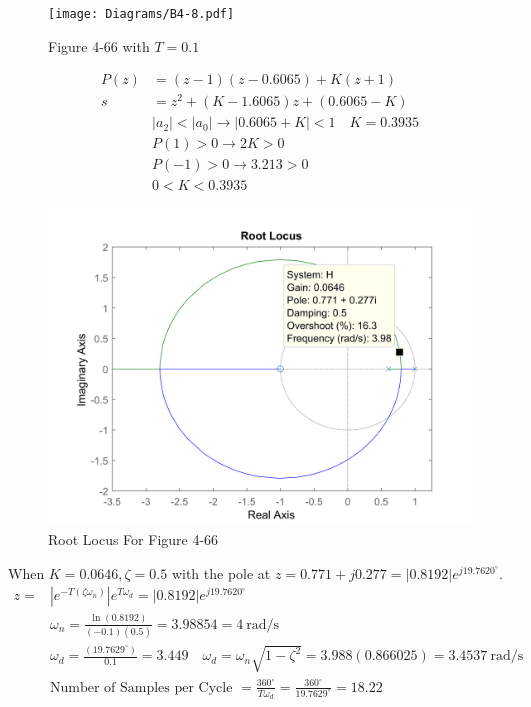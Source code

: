 \begin{figure}[H]
	\centering
	\texttt{[image: Diagrams/B4-8.pdf]}
	\caption*{Figure 4-66 with $T=0.1$}
	\label{fig:samplerblock48}
\end{figure}
\vspace*{-1.05cm}
\begin{align*}
P(z)&=(z-1)(z-0.6065)+K(z+1) \\
    s&=z^2+(K-1.6065)z+(0.6065-K) \\
    & |a_2| < |a_0| \rightarrow |0.6065+K| < 1 \quad K =0.3935 \\
    & P(1) > 0 \rightarrow 2K > 0 \\
    & P(-1) > 0 \rightarrow 3.213 > 0 \\
    & 0 < K < 0.3935
\end{align*}

\begin{figure}[H]
	\centering
	\includegraphics[width=1\linewidth]{Diagrams/B-4-8Rlocus2.png}
	\caption*{Root Locus For Figure 4-66}
	\label{fig:Rlocus}
\end{figure}

When $K=0.0646, \zeta=0.5$ with the pole at $z=0.771+j0.277=|0.8192|e^{j19.7620^\circ}$. 
\begin{align*}
z=  & |e^{-T(\zeta \omega_n)} |e^{T \omega_d} = |0.8192|e^{j19.7620^\circ} \\
& \omega_n = \frac{\ln(0.8192)}{(-0.1)(0.5)}=3.98854 = 4 \ \text{rad/s} \\
& \omega_d = \frac{(19.7629^\circ)}{0.1} = 3.449 \quad  \omega_d = \omega_n \sqrt{1-\zeta^2}=3.988 (0.866025)=3.4537 \ \text{rad/s} \\
& \text{Number of Samples per Cycle } = \frac{360^\circ}{T\omega_d}=\frac{360^\circ}{19.7629^\circ}=18.22
\end{align*}


